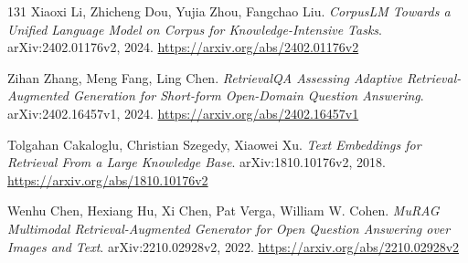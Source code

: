 \documentclass[11pt,a4paper]{article}
\begin{document}
\begin{thebibliography}{131}
Xiaoxi Li, Zhicheng Dou, Yujia Zhou, Fangchao Liu.
\newblock \emph{CorpusLM Towards a Unified Language Model on Corpus for Knowledge-Intensive Tasks}.
\newblock arXiv:2402.01176v2, 2024.
\newblock \url{https://arxiv.org/abs/2402.01176v2}

Zihan Zhang, Meng Fang, Ling Chen.
\newblock \emph{RetrievalQA Assessing Adaptive Retrieval-Augmented Generation for Short-form Open-Domain Question Answering}.
\newblock arXiv:2402.16457v1, 2024.
\newblock \url{https://arxiv.org/abs/2402.16457v1}

Tolgahan Cakaloglu, Christian Szegedy, Xiaowei Xu.
\newblock \emph{Text Embeddings for Retrieval From a Large Knowledge Base}.
\newblock arXiv:1810.10176v2, 2018.
\newblock \url{https://arxiv.org/abs/1810.10176v2}

Wenhu Chen, Hexiang Hu, Xi Chen, Pat Verga, William W. Cohen.
\newblock \emph{MuRAG Multimodal Retrieval-Augmented Generator for Open Question Answering over Images and Text}.
\newblock arXiv:2210.02928v2, 2022.
\newblock \url{https://arxiv.org/abs/2210.02928v2}

\end{thebibliography}
\end{document}
